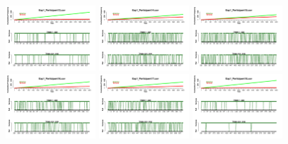\begin{figure}[th]
\includegraphics[width=0.30\textwidth]{Figures/Success_Exp1_P13} \includegraphics[width=0.30\textwidth]{Figures/Success_Exp1_P14} \includegraphics[width=0.30\textwidth]{Figures/Success_Exp1_P15}
\includegraphics[width=0.30\textwidth]{Figures/Success_Exp1_P16} \includegraphics[width=0.30\textwidth]{Figures/Success_Exp1_P17} \includegraphics[width=0.30\textwidth]{Figures/Success_Exp1_P18}

\end{figure}
